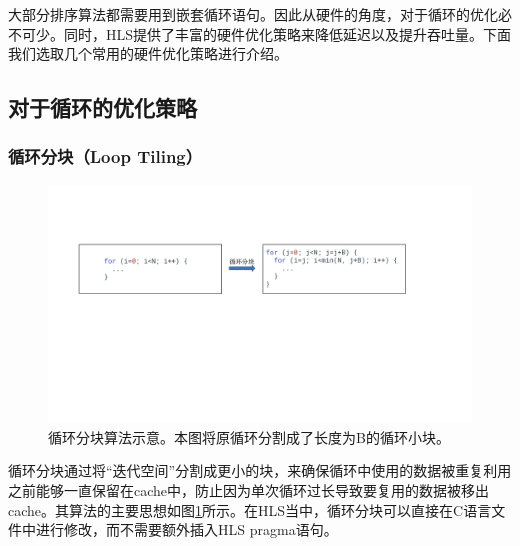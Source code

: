 大部分排序算法都需要用到嵌套循环语句。因此从硬件的角度，对于循环的优化必不可少。同时，HLS提供了丰富的硬件优化策略来降低延迟以及提升吞吐量。下面我们选取几个常用的硬件优化策略进行介绍。

\subsection{对于循环的优化策略}
\subsubsection{循环分块（Loop Tiling）}
\begin{figure}[htbp]
    \centering
    \includegraphics[width=\linewidth]{figures/loop tiling.pdf}
    \caption{循环分块算法示意。本图将原循环分割成了长度为B的循环小块。}
    \label{fig:loop_tiling}
\end{figure}

循环分块通过将“迭代空间”分割成更小的块，来确保循环中使用的数据被重复利用之前能够一直保留在cache中，防止因为单次循环过长导致要复用的数据被移出cache。其算法的主要思想如图\ref{fig:loop_tiling}所示。在HLS当中，循环分块可以直接在C语言文件中进行修改，而不需要额外插入HLS pragma语句。


